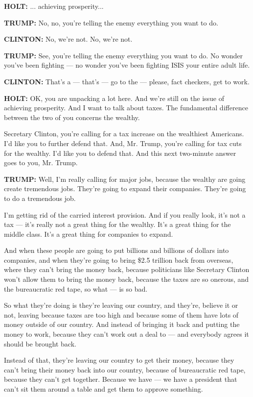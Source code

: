 \textbf{HOLT:} ... achieving prosperity...

\textbf{TRUMP:} No, no, you're telling the enemy everything you want to
do.

\textbf{CLINTON:} No, we're not. No, we're not.

\textbf{TRUMP:} See, you're telling the enemy everything you want to do.
No wonder you've been fighting --- no wonder you've been fighting ISIS
your entire adult life.

\textbf{CLINTON:} That's a --- that's --- go to the --- please, fact
checkers, get to work.

\textbf{HOLT:} OK, you are unpacking a lot here. And we're still on the
issue of achieving prosperity. And I want to talk about taxes. The
fundamental difference between the two of you concerns the wealthy.

Secretary Clinton, you're calling for a tax increase on the wealthiest
Americans. I'd like you to further defend that. And, Mr. Trump, you're
calling for tax cuts for the wealthy. I'd like you to defend that. And
this next two-minute answer goes to you, Mr. Trump.

\textbf{TRUMP:} Well, I'm really calling for major jobs, because the
wealthy are going create tremendous jobs. They're going to expand their
companies. They're going to do a tremendous job.

I'm getting rid of the carried interest provision. And if you really
look, it's not a tax --- it's really not a great thing for the wealthy.
It's a great thing for the middle class. It's a great thing for
companies to expand.

And when these people are going to put billions and billions of dollars
into companies, and when they're going to bring \$2.5 trillion back from
overseas, where they can't bring the money back, because politicians
like Secretary Clinton won't allow them to bring the money back, because
the taxes are so onerous, and the bureaucratic red tape, so what --- is
so bad.

So what they're doing is they're leaving our country, and they're,
believe it or not, leaving because taxes are too high and because some
of them have lots of money outside of our country. And instead of
bringing it back and putting the money to work, because they can't work
out a deal to --- and everybody agrees it should be brought back.

Instead of that, they're leaving our country to get their money, because
they can't bring their money back into our country, because of
bureaucratic red tape, because they can't get together. Because we have
--- we have a president that can't sit them around a table and get them
to approve something.

